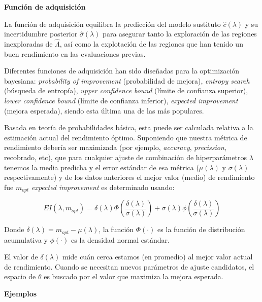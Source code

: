 \quad

\textbf{Función de adquisición}

\quad

La función de adquisición equilibra la predicción del modelo sustituto $\hat{c}(\lambda)$ y su incertidumbre posterior $\hat{\sigma}(\lambda)$ para asegurar tanto la exploración de las regiones inexploradas de $\hat{\varLambda}$, así como la explotación de las regiones que han tenido un buen rendimiento en las evaluaciones previas.

Diferentes funciones de adquisición han sido diseñadas para la optimización bayesiana: \textit{probability of improvement} (probabilidad de mejora), \textit{entropy search} (búsqueda de entropía), \textit{upper confidence bound} (límite de confianza superior), \textit{lower confidence bound} (límite de confianza inferior), \textit{expected improvement} (mejora esperada), siendo esta última una de las más populares.

Basada en teoría de probabilidades básica, esta puede ser calculada relativa a la estimación actual del rendimiento óptimo. Suponiendo que nuestra métrica de rendimiento debería ser maximizada (por ejemplo, \textit{accuracy}, \textit{precission}, recobrado, etc), que para cualquier ajuste de combinación de hiperparámetros $\lambda$ tenemos la media predicha y el error estándar de esa métrica ($\mu(\lambda)$ y $\sigma(\lambda)$ respectivamente) y de los datos anteriores el mejor valor (medio) de rendimiento fue $m_{opt}$ \textit{expected improvement} es determinado usando:

$$
 EI(\lambda, m_{opt}) = \delta(\lambda)\Phi\left(\frac{\delta(\lambda)}{\sigma(\lambda)}\right) + \sigma(\lambda)\phi\left(\frac{\delta(\lambda)}{\sigma(\lambda)} \right)
$$

Donde $\delta(\lambda) = m_{opt} - \mu(\lambda)$, la función  $\Phi(\cdot)$ es la función de distribución acumulativa y $\phi(\cdot)$ es la densidad normal estándar.

El valor de $\delta(\lambda)$ mide cuán cerca estamos (en promedio) al mejor valor actual de rendimiento. Cuando se necesitan nuevos parámetros de ajuste candidatos, el espacio de $\theta$ es buscado por el valor que maximiza la mejora esperada.

\quad

\textbf{Ejemplos}

\quad


